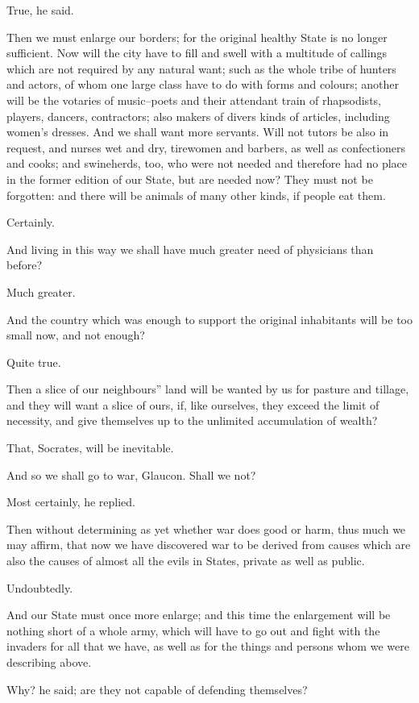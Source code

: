 True, he said.

Then we must enlarge our borders; for the original healthy State is
no longer sufficient. Now will the city have to fill and swell with a
multitude of callings which are not required by any natural want; such
as the whole tribe of hunters and actors, of whom one large class
have to do with forms and colours; another will be the votaries of
music--poets and their attendant train of rhapsodists, players, dancers,
contractors; also makers of divers kinds of articles, including women's
dresses. And we shall want more servants. Will not tutors be also in
request, and nurses wet and dry, tirewomen and barbers, as well as
confectioners and cooks; and swineherds, too, who were not needed and
therefore had no place in the former edition of our State, but are
needed now? They must not be forgotten: and there will be animals of
many other kinds, if people eat them.

Certainly.

And living in this way we shall have much greater need of physicians
than before?

Much greater.

And the country which was enough to support the original inhabitants
will be too small now, and not enough?

Quite true.

Then a slice of our neighbours'' land will be wanted by us for pasture
and tillage, and they will want a slice of ours, if, like ourselves,
they exceed the limit of necessity, and give themselves up to the
unlimited accumulation of wealth?

That, Socrates, will be inevitable.

And so we shall go to war, Glaucon. Shall we not?

Most certainly, he replied.

Then without determining as yet whether war does good or harm, thus much
we may affirm, that now we have discovered war to be derived from causes
which are also the causes of almost all the evils in States, private as
well as public.

Undoubtedly.

And our State must once more enlarge; and this time the enlargement will
be nothing short of a whole army, which will have to go out and fight
with the invaders for all that we have, as well as for the things and
persons whom we were describing above.

Why? he said; are they not capable of defending themselves?

